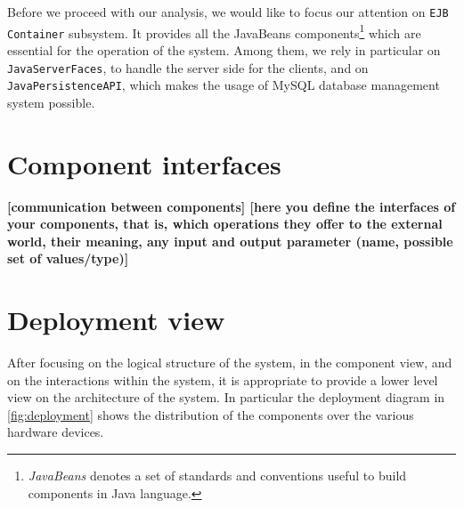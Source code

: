 Before we proceed with our analysis, we would like to focus our attention on \texttt{EJB Con\-tain\-er} subsystem. It provides all the JavaBeans components\footnote{\emph{JavaBeans} denotes a set of standards and conventions useful to build components in Java language.} which are essential for the operation of the system. Among them, we rely in particular on \texttt{Java\-Ser\-ver\-Faces}, to handle the server side for the clients, and on \texttt{Java\-Per\-sist\-ence\-API}, which makes the usage of MySQL database management system possible.




\section{Component interfaces}\label{sec:componentInterfaces}
\textbf{[communication between components] [here you define the interfaces of your components, that is, which operations they offer to the external world, their meaning, any input and output parameter (name, possible set of values/type)]}

\lipsum[1-5]













\clearpage%
\section{Deployment view}\label{sec:deployment}

After focusing on the logical structure of the system, in the component view, and on the interactions within the system, it is appropriate to provide a lower level view on the architecture of the system. In particular the deployment diagram in \cref{fig:deployment} shows the distribution of the components over the various hardware devices.

